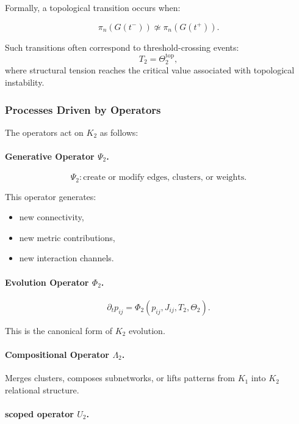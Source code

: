 Formally, a topological transition occurs when:

\[
\pi_n(G(t^-)) \not\simeq \pi_n(G(t^+)).
\]

Such transitions often correspond to threshold-crossing events:
\[
T_2 = \Theta_2^{\text{top}},
\]
where structural tension reaches the critical value associated with
topological instability.

\subsubsection{Processes Driven by Operators}

The operators act on $K_2$ as follows:

\paragraph{Generative Operator \texorpdfstring{$\Psi_2$}{\Psi_2}.}
\[
\Psi_2: \text{create or modify edges, clusters, or weights}.
\]

This operator generates:

\begin{itemize}
    \item new connectivity,
    \item new metric contributions,
    \item new interaction channels.
\end{itemize}

\paragraph{Evolution Operator \texorpdfstring{$\Phi_2$}{\Phi_2}.}

\[
\partial_t p_{ij} = \Phi_2(p_{ij}, J_{ij}, T_2, \Theta_2).
\]

This is the canonical form of $K_2$ evolution.

\paragraph{Compositional Operator \texorpdfstring{$\Lambda_2$}{\Lambda_2}.}

Merges clusters, composes subnetworks, or lifts patterns from $K_1$ into
$K_2$ relational structure.

\paragraph{scoped operator \texorpdfstring{$U_2$}{U_2}.}

